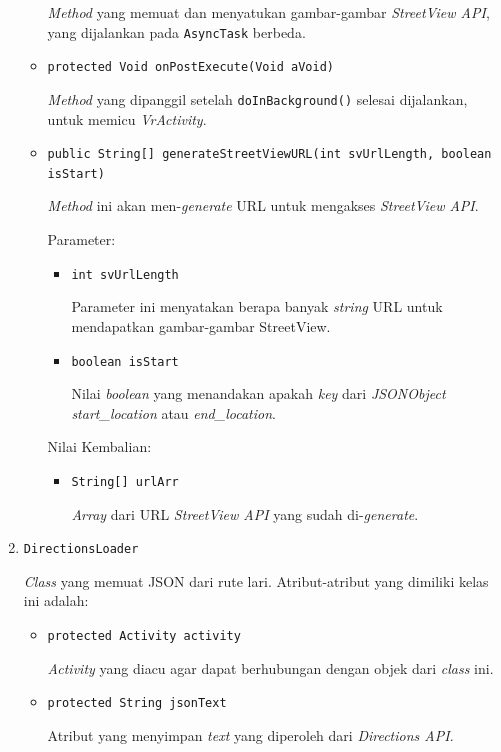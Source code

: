 \begin{enumerate}
\begin{itemize}
		\textit{Method} yang memuat dan menyatukan gambar-gambar \textit{StreetView API}, yang dijalankan pada \texttt{AsyncTask} berbeda. 				
		\item \texttt{protected Void onPostExecute(Void aVoid)}
		
		\textit{Method} yang dipanggil setelah \texttt{doInBackground()} selesai dijalankan, untuk memicu \textit{VrActivity}.
		\item \texttt{public String[] generateStreetViewURL(int svUrlLength, boolean isStart)}
		
		\textit{Method} ini akan men-\textit{generate} URL untuk mengakses  \textit{StreetView API}. 
		
		Parameter:
		
		\begin{itemize}
			\item \texttt{int svUrlLength}
			
			Parameter ini menyatakan berapa banyak \textit{string} URL untuk mendapatkan gambar-gambar StreetView.
			\item \texttt{boolean isStart}
			
			Nilai \textit{boolean} yang menandakan apakah \textit{key} dari \textit{JSONObject} \textit{start\_location} atau \textit{end\_location}.
		\end{itemize}
		
		Nilai Kembalian:
	
		\begin{itemize}
			\item \texttt{String[] urlArr}
		
			\textit{Array} dari URL \textit{StreetView API} yang sudah di-\textit{generate}.		
		\end{itemize}
	\end{itemize}		
	
	\item \texttt{DirectionsLoader}
	
	\textit{Class} yang memuat JSON dari rute lari. Atribut-atribut yang dimiliki kelas ini adalah:
	\begin{itemize}
	
		\item \texttt{protected Activity activity}
		
		\textit{Activity} yang diacu agar dapat berhubungan dengan objek dari \textit{class} ini.
	
		\item \texttt{protected String jsonText}
		
		Atribut yang menyimpan \textit{text} yang diperoleh dari \textit{Directions API}.
	\end{itemize}
	

\end{enumerate}
